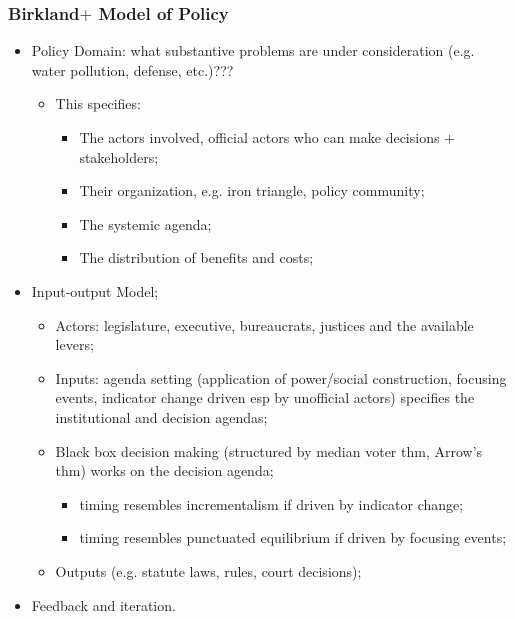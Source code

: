 \documentclass[aspectratio=169]{beamer}
\theoremstyle{principle}
\begin{document}
\begin{frame}
\frametitle{Birkland$+$ Model of Policy}
\begin{itemize}
\item Policy Domain: what substantive problems are under consideration (e.g. water pollution, defense, etc.)???
\begin{itemize}
\item This specifies:
\begin{itemize}
\item The actors involved, official actors who can make decisions $+$ stakeholders; 
\item Their organization, e.g. iron triangle, policy community;
\item The systemic agenda; 
\item The distribution of benefits and costs;
\end{itemize} 
\end{itemize}
\bigskip
\item \color{black}Input-output Model;
\begin{itemize}
\item Actors: legislature, executive, bureaucrats, justices and the available levers;
\item Inputs: agenda setting (application of power/social construction, focusing events, indicator change driven esp by unofficial actors) specifies the institutional and decision agendas;
\item Black box decision making (structured by median voter thm, Arrow's thm) works on the decision agenda;
\begin{itemize}
\item timing resembles incrementalism if driven by indicator change;
\item timing resembles punctuated equilibrium if driven by focusing events;
 \end{itemize}
\item Outputs (e.g. statute laws, rules, court decisions);
\end{itemize}
\bigskip
\item Feedback and iteration.
\end{itemize}
\end{frame}
\end{document}
